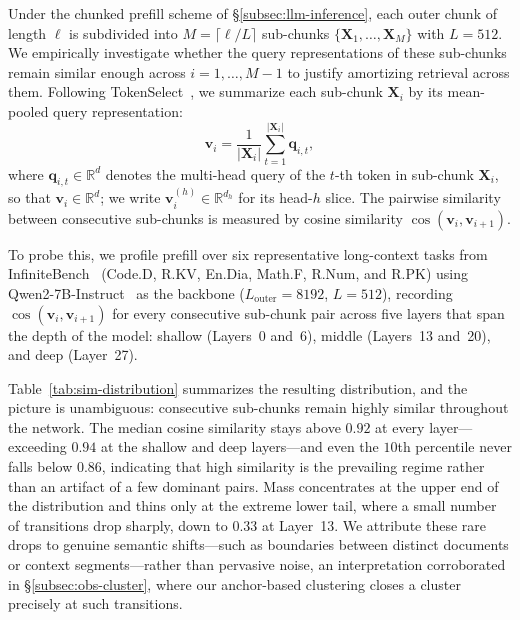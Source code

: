 \documentclass[10pt,conference]{IEEEtran}
\begin{document}
Under the chunked prefill scheme of §\ref{subsec:llm-inference}, each 
outer chunk of length $\ell$ is subdivided into 
$M = \lceil \ell / L \rceil$ sub-chunks 
$\{\mathbf{X}_1, \ldots, \mathbf{X}_M\}$ with $L = 512$. We empirically 
investigate whether the query representations of these sub-chunks 
remain similar enough across $i = 1, \ldots, M-1$ to justify 
amortizing retrieval across them. Following 
TokenSelect~\cite{tokenselect2025}, we summarize each sub-chunk 
$\mathbf{X}_i$ by its mean-pooled query representation:
\begin{equation}
    \mathbf{v}_i = \frac{1}{|\mathbf{X}_i|} \sum_{t=1}^{|\mathbf{X}_i|} \mathbf{q}_{i,t},
    \label{eq:chunk-fingerprint}
\end{equation}
where $\mathbf{q}_{i,t} \in \mathbb{R}^{d}$ denotes the multi-head query
of the $t$-th token in sub-chunk $\mathbf{X}_i$, so that
$\mathbf{v}_i \in \mathbb{R}^{d}$; we write
$\mathbf{v}_i^{(h)} \in \mathbb{R}^{d_h}$ for its head-$h$ slice. The pairwise similarity between consecutive 
sub-chunks is measured by cosine similarity 
$\cos(\mathbf{v}_i, \mathbf{v}_{i+1})$.

To probe this, we profile prefill over six representative long-context
tasks from InfiniteBench~\cite{zhang_etal_2024_bench} (Code.D, R.KV,
En.Dia, Math.F, R.Num, and R.PK) using
Qwen2-7B-Instruct~\cite{yang2024qwen2} as the backbone
($L_{\text{outer}} = 8192$, $L = 512$), recording
$\cos(\mathbf{v}_i, \mathbf{v}_{i+1})$ for every consecutive sub-chunk
pair across five layers that span the depth of the model: shallow
(Layers~0 and~6), middle (Layers~13 and~20), and deep (Layer~27).

Table~\ref{tab:sim-distribution} summarizes the resulting distribution,
and the picture is unambiguous: consecutive sub-chunks remain highly
similar throughout the network. The median cosine similarity stays
above $0.92$ at every layer---exceeding $0.94$ at the shallow and deep
layers---and even the $10$th percentile never falls below $0.86$,
indicating that high similarity is the prevailing regime rather than
an artifact of a few dominant pairs. Mass concentrates at the upper
end of the distribution and thins only at the extreme lower tail, where
a small number of transitions drop sharply, down to $0.33$ at Layer~13.
We attribute these rare drops to genuine semantic shifts---such as
boundaries between distinct documents or context segments---rather than
pervasive noise, an interpretation corroborated in
§\ref{subsec:obs-cluster}, where our anchor-based clustering closes a
cluster precisely at such transitions.
\end{document}
